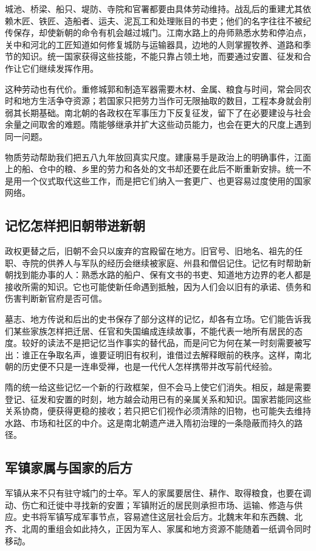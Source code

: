 城池、桥梁、船只、堤防、寺院和官署都要由具体劳动维持。战乱后的重建尤其依赖木匠、铁匠、造船者、运夫、泥瓦工和处理账目的书吏；他们的名字往往不被纪传保存，却使新朝的命令有机会越过城门。江南水路上的舟师熟悉水势和停泊点，关中和河北的工匠知道如何修复城防与运输器具，边地的人则掌握牧养、道路和季节的知识。统一国家获得这些技能，不能只靠占领土地，而要通过安置、征发和合作让它们继续发挥作用。

这种劳动也有代价。重修城郭和制造军器需要木材、金属、粮食与时间，常会同农时和地方生活争夺资源；若国家只把劳力当作可无限抽取的数目，工程本身就会削弱其长期基础。南北朝的各政权在军事压力下反复征发，留下了在必要建设与社会余量之间取舍的难题。隋能够继承并扩大这些动员能力，也会在更大的尺度上遇到同一问题。

物质劳动帮助我们把五八九年放回真实尺度。建康易手是政治上的明确事件，江面上的船、仓中的粮、乡里的劳力和各处的文书却还要在此后不断重新安排。统一不是用一个仪式取代这些工作，而是把它们纳入一套更广、也更容易过度使用的国家网络。

\subsection{记忆怎样把旧朝带进新朝}

政权更替之后，旧朝不会只以废弃的宫殿留在地方。旧官号、旧地名、祖先的任职、寺院的供养人与军队的经历会继续被家庭、州县和僧侣记住。记忆有时帮助新朝找到能办事的人：熟悉水路的船户、保有文书的书吏、知道地方边界的老人都是接收所需的知识。它也可能使新任命遇到抵触，因为人们会以旧有的承诺、债务和伤害判断新官府是否可信。

墓志、地方传说和后出的史书保存了部分这样的记忆，却各有立场。它们能告诉我们某些家族怎样把迁居、任官和失国编成连续故事，不能代表一地所有居民的态度。较好的读法不是把记忆当作事实的替代品，而是问它为何在某一时刻需要被写出：谁正在争取名声，谁要证明旧有权利，谁借过去解释眼前的秩序。这样，南北朝的历史便不只是一连串受禅，也是一代代人怎样携带并改写前代经验。

隋的统一给这些记忆一个新的行政框架，但不会马上使它们消失。相反，越是需要登记、征发和安置的时刻，地方越会动用已有的亲属关系和知识。国家若能同这些关系协商，便获得更稳的接收；若只把它们视作必须清除的旧物，也可能失去维持水路、市场和社区的中介。这是南北朝遗产进入隋初治理的一条隐蔽而持久的路径。

\subsection{军镇家属与国家的后方}

军镇从来不只有驻守城门的士卒。军人的家属要居住、耕作、取得粮食，也要在调动、伤亡和迁徙中寻找新的安置；军镇附近的居民则承担市场、运输、修造与供应。史书将军镇写成军事节点，容易遮住这层社会后方。北魏末年和东西魏、北齐、北周的重组会如此持久，正因为军人、家属和地方资源不能随着一纸调令同时移动。

